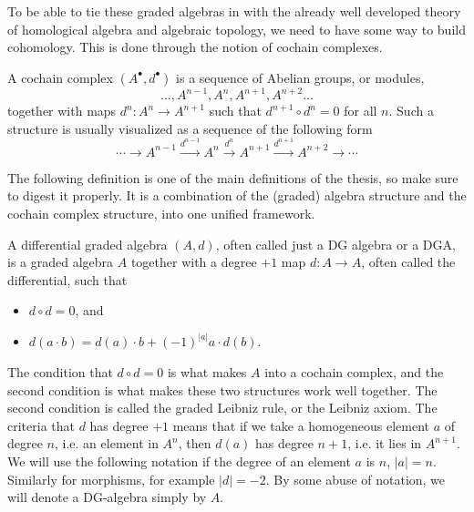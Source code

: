 To be able to tie these graded algebras in with the already well developed theory of homological algebra and algebraic topology, we need to have some way to build cohomology. This is done through the notion of cochain complexes. 

\begin{definition}
A cochain complex $(A^{\bullet}, d^{\bullet})$ is a sequence of Abelian groups, or modules,
\begin{equation*}
    \ldots, A^{n-1}, A^n, A^{n+1}, A^{n+2}\ldots
\end{equation*}
together with maps $d^n:A^n\rightarrow A^{n+1}$ such that $d^{n+1}\circ d^n = 0$ for all $n$. Such a structure is usually visualized as a sequence of the following form
\begin{equation*}
    \cdots\longrightarrow A^{n-1} \overset{d^{n-1}}\longrightarrow A^n \overset{d^n}\longrightarrow A^{n+1} \overset{d^{n+1}}\longrightarrow A^{n+2}\longrightarrow\cdots
\end{equation*}
\end{definition}

The following definition is one of the main definitions of the thesis, so make sure to digest it properly. It is a combination of the (graded) algebra structure and the cochain complex structure, into one unified framework. 

\begin{definition}
A differential graded algebra $(A, d)$, often called just a DG algebra or a DGA, is a graded algebra $A$ together with a degree $+1$ map $d: A\rightarrow A$, often called the differential, such that 
\begin{itemize}
    \item $d\circ d = 0$, and
    \item $d(a\cdot b) = d(a)\cdot b + (-1)^{|a|}a\cdot d(b)$. 
\end{itemize}
\end{definition}

The condition that $d\circ d = 0$ is what makes $A$ into a cochain complex, and the second condition is what makes these two structures work well together. The second condition is called the graded Leibniz rule, or the Leibniz axiom. The criteria that $d$ has degree $+1$ means that if we take a homogeneous element $a$ of degree $n$, i.e. an element in $A^n$, then $d(a)$ has degree $n+1$, i.e. it lies in $A^{n+1}$. We will use the following notation if the degree of an element $a$ is $n$, $|a|=n$. Similarly for morphisms, for example $|d|=-2$. By some abuse of notation, we will denote a DG-algebra simply by $A$.

